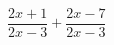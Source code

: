 \begin{ex}
	\begin{condition}
		\( \dfrac{2x+1}{2x-3}+\dfrac{2x-7}{2x-3} \)
	\end{condition}
\end{ex}
